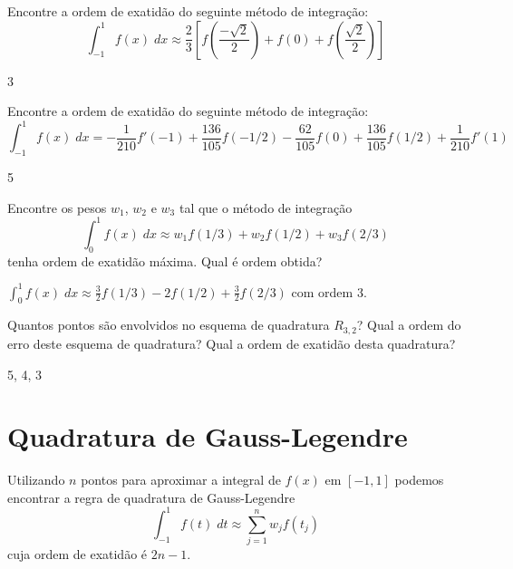 \begin{exer}
Encontre a ordem de exatidão do seguinte método de integração:
\begin{equation} \int_{-1}^1f(x)\;dx\approx \frac{2}{3}\left[f\left(\frac{-\sqrt{2}}{2}\right)+f(0)+f\left(\frac{\sqrt{2}}{2}\right)\right] \end{equation}
\end{exer}
\begin{resp}
3
\end{resp}


\begin{exer}
Encontre a ordem de exatidão do seguinte método de integração:
\begin{equation} \int_{-1}^1f(x)\;dx=-\frac{1}{210}f'(-1)+\frac{136}{105} f(-1/2) - \frac{62}{105} f(0) + \frac{136}{105}f(1/2) +\frac{1}{210}f'(1) \end{equation}
\end{exer}
\begin{resp}
5
\end{resp}

\begin{exer} Encontre os pesos $w_1$, $w_2$ e $w_3$ tal que o método de integração
\begin{equation} \int_0^1 f(x)\;dx \approx w_1 f(1/3)  + w_2f(1/2) + w_3f(2/3) \end{equation}
tenha ordem de exatidão máxima. Qual é ordem obtida?
\end{exer}
\begin{resp}
$\int_0^1 f(x)\;dx \approx \frac{3}{2} f(1/3)  -2f(1/2) + \frac{3}{2}f(2/3)$ com ordem 3.
\end{resp}

\begin{exer}
Quantos pontos são envolvidos no esquema de quadratura $R_{3,2}$? Qual a ordem do erro deste esquema de quadratura? Qual a ordem de exatidão desta quadratura?
\end{exer}
\begin{resp}
 5, 4, 3
\end{resp}


\section{Quadratura de Gauss-Legendre}

Utilizando $n$ pontos para aproximar a integral de $f(x)$ em $[-1,1]$ podemos encontrar a regra de quadratura de Gauss-Legendre
\begin{equation} \int_{-1}^1 f(t)\;dt \approx \sum_{j=1}^n w_j f(t_j) \end{equation}
cuja ordem de exatidão é $2n-1$.

